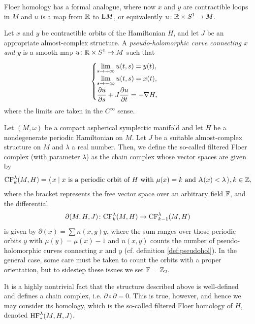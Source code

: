 \begin{itemize}
Floer homology has a formal analogue, where now $x$ and $y$ are contractible loops in $M$ and $u$ is a map from $\mathbb{R}$ to $\mathrm{L} M$, or equivalently $u \colon \mathbb{R} \times S^1 \to M$.

\begin{definition}\label{def:pseudohol}
Let $x$ and $y$ be contractible orbits of the Hamiltonian $H$, and let $J$ be an appropriate almost-complex structure. A \emph{pseudo-holomorphic curve connecting $x$ and $y$} is a smooth map $u \colon \mathbb{R} \times S^1 \to M$ such that
\begin{equation}
\begin{cases}
\displaystyle \lim_{s \to +\infty} u(t,s) = y(t),\\
\displaystyle \lim_{s \to -\infty} u(t,s) = x(t),\\[0.2cm]
\displaystyle \diffp u s + J \diffp u t = - \grad H,
\end{cases}
\end{equation}
where the limits are taken in the $C^\infty$ sense.
\end{definition}
\end{itemize}

\begin{definition}
Let $(M,\omega)$ be a compact aspherical symplectic manifold and let $H$ be a nondegenerate periodic Hamiltonian on $M$. Let $J$ be a suitable almost-complex structure on $M$ and $\lambda$ a real number. Then, we define the so-called filtered Floer complex (with parameter $\lambda$) as the chain complex whose vector spaces are given by
\begin{equation}
\mathrm{CF}_k^\lambda(M, H) = \langle\, x \mid \text{$x$ is a periodic orbit of $H$ with $\mu(x) = k$ and $\mathrm{A}(x) < \lambda$}\,\rangle, k \in \mathbb{Z},
\end{equation}
where the bracket represents the free vector space over an arbitrary field $\mathbb{F}$, and the differential
\begin{equation}
\partial(M,H,J) \colon \mathrm{CF}_k^\lambda(M,H) \to \mathrm{CF}_{k-1}^\lambda(M,H)
\end{equation}
is given by $\partial(x) = \sum n(x,y) y$, where the sum ranges over those periodic orbits $y$ with $\mu(y) = \mu(x) - 1$ and $n(x,y)$ counts the number of pseudo-holomorphic curves connecting $x$ and $y$ (cf. definition \ref{def:pseudohol}). In the general case, some care must be taken to count the orbits with a proper orientation, but to sidestep these issues we set $\mathbb{F} = \mathbb{Z}_2$.

It is a highly nontrivial fact that the structure described above is well-defined and defines a chain complex, i.e. $\partial \circ \partial = 0$. This is true, however, and hence we may consider its homology, which is the so-called filtered Floer homology of $H$, denoted $\mathrm{HF}_*^\lambda(M,H,J)$.
\end{definition}

